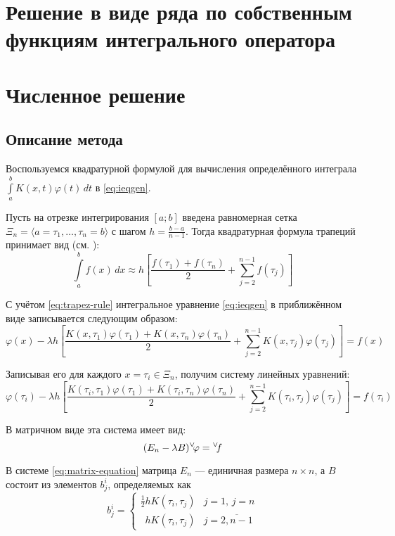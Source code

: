 \documentclass{article}
\numberwithin{equation}{section}
\renewcommand{\phi}{\varphi}
\newcommand{\intl}{\int\limits}
\renewcommand{\vec}[1]{{}^{\vee}\negmedspace#1}
\begin{document}
\section{Решение в виде ряда по собственным функциям интегрального
  оператора}

\clearpage
\section{Численное решение}
\label{sec:numeric}
\subsection{Описание метода}
Воспользуемся квадратурной формулой для вычисления определённого
интеграла $\intl_a^b {K(x, t) \phi(t)\,dt}$ в \eqref{eq:ieqgen}.

Пусть на отрезке интегрирования $[a; b]$ введена равномерная сетка
$\Xi_n = \langle a = \tau_1, \dotsc, \tau_n = b \rangle$ с шагом
$h = \frac{b-a}{n-1}$. Тогда квадратурная формула трапеций принимает
вид (см. \cite{bakhvalov01}):
\begin{equation}
  \label{eq:trapez-rule}
  \intl_a^b{f(x)\,dx} \approx h \left [ \frac{f(\tau_1)+f(\tau_n)}{2} +
  \sum_{j=2}^{n-1} f(\tau_j) \right ]
\end{equation}

С учётом \eqref{eq:trapez-rule} интегральное уравнение
\eqref{eq:ieqgen} в приближённом виде записывается следующим образом:
\begin{equation*}
  \phi(x) - \lambda h \left[ 
    \frac{K(x,\tau_1) \phi(\tau_1) + 
      K(x,\tau_n) \phi(\tau_n)}{2} + 
    \sum_{j=2}^{n-1} K(x, \tau_{j}) \phi(\tau_{j}) 
  \right] = f(x)
\end{equation*}

Записывая его для каждого $x = \tau_i \in \Xi_n$, получим систему линейных
уравнений:
\begin{equation*}
  \phi(\tau_i) - \lambda h \left[ 
    \frac{K(\tau_i,\tau_1) \phi(\tau_1) + 
      K(\tau_i,\tau_n) \phi(\tau_n)}{2} + 
    \sum_{j=2}^{n-1} K(\tau_i, \tau_{j}) \phi(\tau_{j}) 
  \right] = f(\tau_i)
\end{equation*}

В матричном виде эта система имеет вид:
\begin{equation}
  \label{eq:matrix-equation}
  (E_n-\lambda B) \vec{\phi} = \vec{f}
\end{equation}

В системе \eqref{eq:matrix-equation} матрица $E_n$ — единичная размера
$n×n$, а $B$ состоит из элементов $b_j^i$, определяемых как
\begin{equation}
  \label{eq:B-matrix-element}
  b_j^i =
  \begin{cases}
    \frac{1}{2}hK(\tau_i, \tau_j) & j = 1,\, j = n \\
    \phantom{\frac{1}{2}} hK(\tau_i, \tau_j) & j = \overline{2,n-1}
  \end{cases}
\end{equation}
\end{document}
